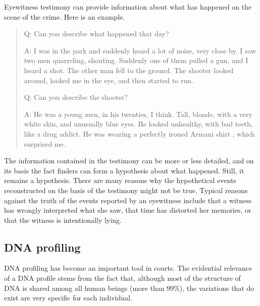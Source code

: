 \documentclass[10pt]{article}
\begin{document}
Eyewitness testimony can provide information about what 
has happened on the scene of the crime. Here is an example.
%
\begin{quote}
Q: Can you describe what happened that day?

A: I was in the park and suddenly heard a lot of noise, very close by. I saw two men quarreling, shouting. Suddenly one of them pulled a gun, 
and I heard a shot. The other man fell to the ground. The shooter looked around, looked me in the eye, and then started to run.

Q: Can you describe the shooter?

A: He was a young men, in his twenties, I think. Tall, blonde, with a very white skin, and unusually blue eyes. 
He looked unhealthy, with bad teeth, 
like a drug addict. He was wearing a perfectly ironed Armani shirt%
, which surprised me. %
\end{quote}
%
The information contained in the testimony can be 
more or less detailed, and on its basis the fact finders
can form a hypothesis about what happened. 
Still, it remains a hypothesis. There are many reasons why the hypothetical events reconstructed on the basis of the testimony might not be true. Typical reasons against the truth of the events reported by an eyewitness include that a witness has wrongly interpreted what she saw, that time has distorted her memories, or that the witness is intentionally lying. 

\subsection{DNA profiling}

DNA profiling has become an important tool in courts. The evidential relevance of a DNA profile stems from the fact that, although most of the structure of DNA is shared among all human beings (more than 99\%), the variations that do exist are very specific for each individual. %
\end{document}
